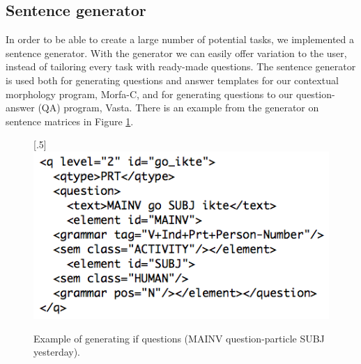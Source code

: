 \documentclass[11pt]{article}
\begin{document}

\subsection{Sentence generator}\label{set}
In order to be able to create a large number of potential tasks, we implemented a sentence generator. With the generator we can easily offer variation to the user, instead of tailoring every task with ready-made questions. The sentence generator is used both for generating questions and answer templates for our contextual morphology program, Morfa-C, and for generating questions to our question-answer (QA) program, Vasta. There is an example from the generator on sentence matrices in Figure \ref{questionv}.

\begin{figure}[htbp]
\begin{center}
\scalebox{.5}[.5]{\includegraphics{presentation/img/question_vasta2.png}}\\
\caption{Example of generating if questions (MAINV question-particle SUBJ yesterday).}
\label{questionv}
\end{center}
\end{figure}
\end{document}
